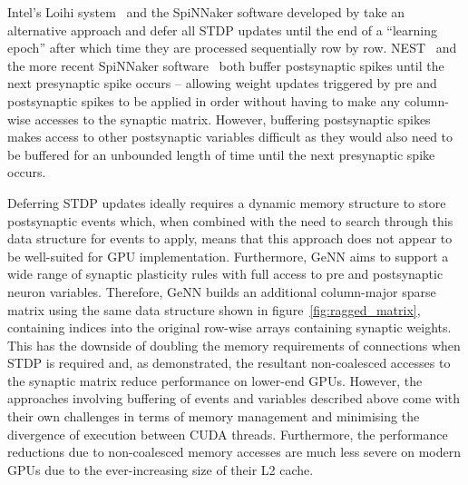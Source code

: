 \documentclass[utf8]{frontiersSCNS} %
\begin{document}
Intel's Loihi system~\citep{Davies2018} and the SpiNNaker software developed by \citet{Galluppi2014a} take an alternative approach and defer all STDP updates until the end of a ``learning epoch'' after which time they are processed sequentially row by row.
NEST~\citep{Morrison2007} and the more recent SpiNNaker software~\citep{Knight2016} both buffer postsynaptic spikes until the next presynaptic spike occurs -- allowing weight updates triggered by pre and postsynaptic spikes to be applied in order without having to make any column-wise accesses to the synaptic matrix. 
However, buffering postsynaptic spikes makes access to other postsynaptic variables difficult as they would also need to be buffered for an unbounded length of time until the next presynaptic spike occurs.

Deferring STDP updates ideally requires a dynamic memory structure to store postsynaptic events which, when combined with the need to search through this data structure for events to apply, means that this approach does not appear to be well-suited for GPU implementation.
Furthermore, GeNN aims to support a wide range of synaptic plasticity rules with full access to pre and postsynaptic neuron variables.
Therefore, GeNN builds an additional column-major sparse matrix using the same data structure shown in figure~\ref{fig:ragged_matrix}, containing indices into the original row-wise arrays containing synaptic weights.
This has the downside of doubling the memory requirements of connections when STDP is required and, as \citet{Yavuz2016} demonstrated, the resultant non-coalesced accesses to the synaptic matrix reduce performance on lower-end GPUs. 
However, the approaches involving buffering of events and variables described above come with their own challenges in terms of memory management and minimising the divergence of execution between CUDA threads.
Furthermore, the performance reductions due to non-coalesced memory accesses are much less severe on modern GPUs due to the ever-increasing size of their L2 cache.
\end{document}
